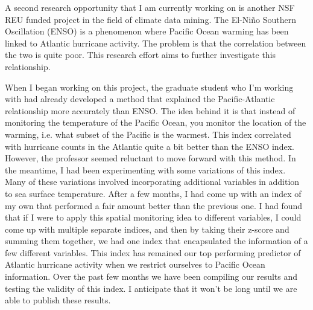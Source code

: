 \documentclass[a4paper,12pt]{article}
\begin{document}
A second research opportunity that I am currently working on is another NSF REU funded project in the field of climate data mining.  The El-Ni\~{n}o Southern Oscillation (ENSO) is a phenomenon where Pacific Ocean warming has been linked to Atlantic hurricane activity\cite{enso}.  The problem is that the correlation between the two is quite poor.  This research effort aims to further investigate this relationship. 

When I began working on this project, the graduate student who I'm working with had already developed a method that explained the Pacific-Atlantic relationship more accurately than ENSO.  The idea behind it is that instead of monitoring the temperature of the Pacific Ocean, you monitor the location of the warming, i.e. what subset of the Pacific is the warmest.  This index correlated with hurricane counts in the Atlantic quite a bit better than the ENSO index.  However, the professor seemed reluctant to move forward with this method.  In the meantime, I had been experimenting with some variations of this index.  Many of these variations involved incorporating additional variables in addition to sea surface temperature.  After a few months, I had come up with an index of my own that performed a fair amount better than the previous one.  I had found that if I were to apply this spatial monitoring idea to different variables, I could come up with multiple separate indices, and then by taking their z-score and summing them together, we had one index that encapsulated the information of a few different variables.  This index has remained our top performing predictor of Atlantic hurricane activity when we restrict ourselves to Pacific Ocean information.  Over the past few months we have been compiling our results and testing the validity of this index.  I anticipate that it won't be long until we are able to publish these results.
\end{document}
